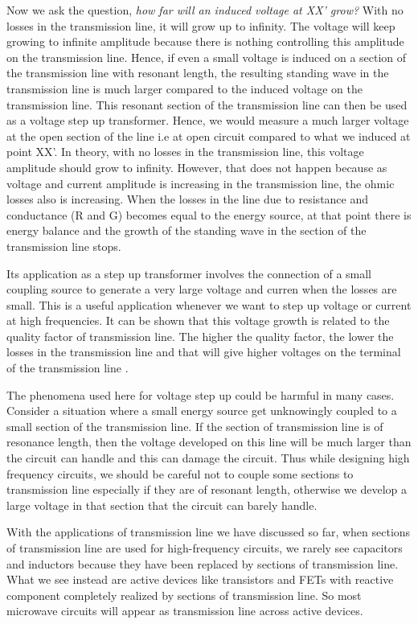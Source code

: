 Now we ask the question, \emph{how far will an induced voltage at XX' grow?} With no losses in the transmission line, it will grow up to infinity. The voltage will keep growing to infinite amplitude because there is nothing controlling this amplitude on the transmission line. Hence, if even a small voltage is induced on a section of the transmission line with resonant length, the resulting standing wave in the transmission line is much larger compared to the induced voltage on the transmission line. This resonant section of the transmission line can then be used as a voltage step up transformer. Hence, we would measure a much larger voltage at the open section of the line i.e at open circuit compared to what we induced at point XX'. In theory, with no losses in the transmission line, this voltage amplitude should grow to infinity. However, that does not happen because as voltage and current amplitude is increasing in the transmission line, the ohmic losses also is increasing. When the losses in the line due to resistance and conductance (R and G) becomes equal to the energy source, at that point there is energy balance and the growth of the standing wave in the section of the transmission line stops.

Its application as a step up transformer involves the connection of a small coupling source to generate a very large voltage and curren when the losses are small. This is a useful application whenever we want to step up voltage or current at high frequencies. It can be shown that this voltage growth is related to the quality factor of transmission line. The higher the quality factor, the lower the losses in the transmission line and that will give higher voltages on the terminal of the transmission line .

The phenomena used here for voltage step up could be harmful in many cases. Consider a situation where a small energy source get unknowingly coupled to a small section of the transmission line. If the section of transmission line is of resonance length, then the voltage developed on this line will be much larger than the circuit can handle and this can damage the circuit. Thus while designing high frequency circuits, we should be careful not to couple some sections to transmission line especially if they are of resonant length, otherwise we develop a large voltage in that section that the circuit can barely handle. 

With the applications of transmission line we have discussed so far, when sections of transmission line are used for high-frequency circuits, we rarely see capacitors and inductors because they have been replaced by sections of transmission line. What we see instead are active devices like transistors and FETs with reactive component completely realized by sections of transmission line. So most microwave circuits will appear as transmission line across active devices.
